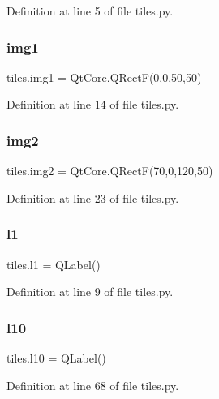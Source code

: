 Definition at line 5 of file tiles.\+py.

\mbox{\label{namespacetiles_a4ef5bc0ece7b55258e0118f28d8d06b9}} 
\subsubsection{\texorpdfstring{img1}{img1}}
{\footnotesize\ttfamily tiles.\+img1 = Qt\+Core.\+Q\+RectF(0,0,50,50)}



Definition at line 14 of file tiles.\+py.

\mbox{\label{namespacetiles_a7e395173f3d75429315d4088c004d05f}} 
\subsubsection{\texorpdfstring{img2}{img2}}
{\footnotesize\ttfamily tiles.\+img2 = Qt\+Core.\+Q\+RectF(70,0,120,50)}



Definition at line 23 of file tiles.\+py.

\mbox{\label{namespacetiles_afb4c3a11c5754ea1031dc68c0f7c8f6a}} 
\subsubsection{\texorpdfstring{l1}{l1}}
{\footnotesize\ttfamily tiles.\+l1 = Q\+Label()}



Definition at line 9 of file tiles.\+py.

\mbox{\label{namespacetiles_aae1be53b3a011f7f21f6796aa59ec9c3}} 
\subsubsection{\texorpdfstring{l10}{l10}}
{\footnotesize\ttfamily tiles.\+l10 = Q\+Label()}



Definition at line 68 of file tiles.\+py.

\mbox{\label{namespacetiles_a684c78d24b79d056e12a9b5c8aa86ecd}} 
